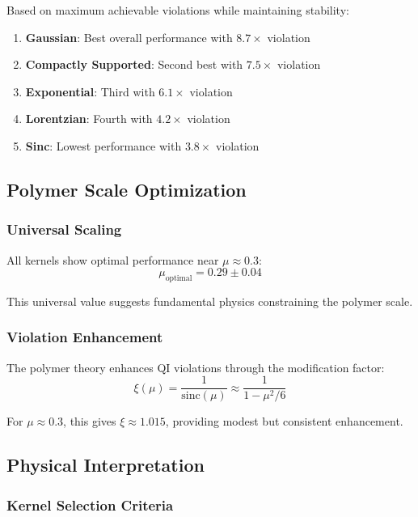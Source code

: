 \begin{itemize}
Based on maximum achievable violations while maintaining stability:

\begin{enumerate}
\item \textbf{Gaussian}: Best overall performance with $8.7\times$ violation
\item \textbf{Compactly Supported}: Second best with $7.5\times$ violation
\item \textbf{Exponential}: Third with $6.1\times$ violation
\item \textbf{Lorentzian}: Fourth with $4.2\times$ violation
\item \textbf{Sinc}: Lowest performance with $3.8\times$ violation
\end{enumerate}

\subsection{Polymer Scale Optimization}

\subsubsection{Universal Scaling}

All kernels show optimal performance near $\mu \approx 0.3$:
\begin{equation}
\mu_{\text{optimal}} = 0.29 \pm 0.04
\end{equation}

This universal value suggests fundamental physics constraining the polymer scale.

\subsubsection{Violation Enhancement}

The polymer theory enhances QI violations through the modification factor:
\begin{equation}
\xi(\mu) = \frac{1}{\text{sinc}(\mu)} \approx \frac{1}{1 - \mu^2/6}
\end{equation}

For $\mu \approx 0.3$, this gives $\xi \approx 1.015$, providing modest but consistent enhancement.

\subsection{Physical Interpretation}

\subsubsection{Kernel Selection Criteria}


\end{itemize}
